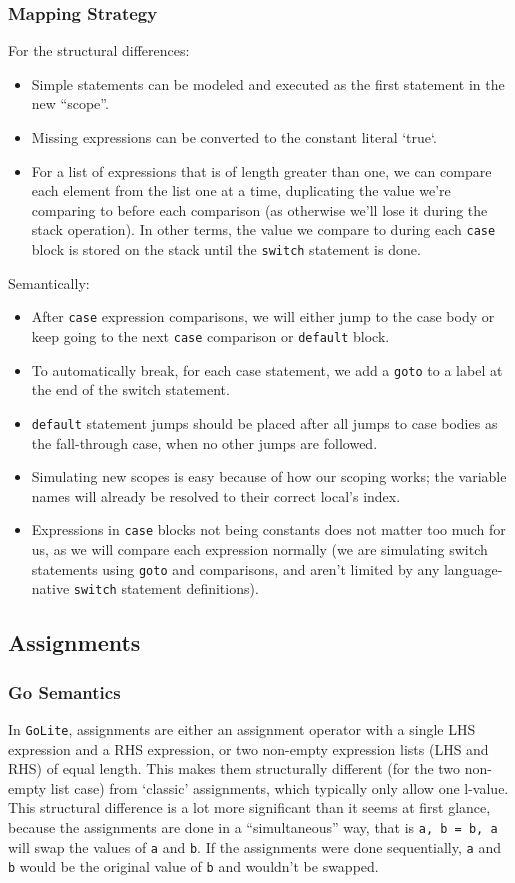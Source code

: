 \documentclass[11pt]{article}
\begin{document}
\subsubsection{Mapping Strategy}
\label{sec:orgf287ca0}
For the structural differences:
\begin{itemize}[noitemsep]
\item Simple statements can be modeled and executed as the first statement in
the new ``scope''.
\item Missing expressions can be converted to the constant literal `true`.
\item For a list of expressions that is of length greater than one, we
can compare each element from the list one at a time, duplicating the
value we're comparing to before each comparison (as otherwise
we'll lose it during the stack operation). In other terms, the value we
compare to during each \texttt{case} block is stored on the stack until the
\texttt{switch} statement is done.
\end{itemize}
Semantically:
\begin{itemize}[noitemsep]
\item After \texttt{case} expression comparisons, we will either jump to the case body
or keep going to the next \texttt{case} comparison or \texttt{default} block.
\item To automatically break, for each case statement, we add a \texttt{goto}
to a label at the end of the switch statement.
\item \texttt{default} statement jumps should be placed after all jumps to case bodies
as the fall-through case, when no other jumps are followed.
\item Simulating new scopes is easy because of how our scoping works;
the variable names will already be resolved to their correct local's
index.
\item Expressions in \texttt{case} blocks not being constants does not matter too much
for us, as we will compare each expression normally (we are
simulating switch statements using \texttt{goto} and comparisons, and aren't
limited by any language-native \texttt{switch} statement definitions).
\end{itemize}
\subsection{Assignments}
\label{sec:orge8ef9fe}
\subsubsection{Go Semantics}
\label{sec:org179454b}
In \texttt{GoLite}, assignments are either an assignment operator with a
single LHS expression and a RHS expression, or two non-empty
expression lists (LHS and RHS) of equal length. This makes them structurally
different (for the two non-empty list case) from `classic'
assignments, which typically only allow one l-value.
This structural difference is a lot more significant than it seems
at first glance, because the assignments are done in a ``simultaneous''
way, that is \texttt{a, b = b, a} will swap the values of \texttt{a} and \texttt{b}. If the
assignments were done sequentially, \texttt{a} and \texttt{b} would be the
original value of \texttt{b} and wouldn't be swapped.
\end{document}
